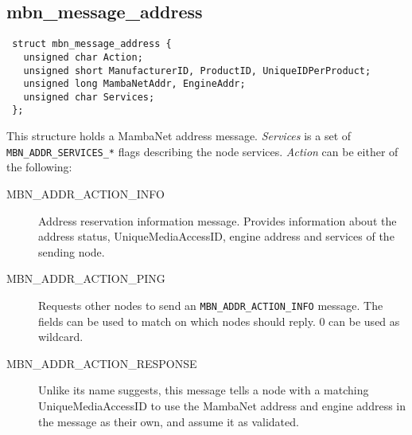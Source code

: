 \subsection{mbn\_message\_address}
\begin{verbatim}
 struct mbn_message_address {
   unsigned char Action;
   unsigned short ManufacturerID, ProductID, UniqueIDPerProduct;
   unsigned long MambaNetAddr, EngineAddr;
   unsigned char Services;
 };
\end{verbatim}
This structure holds a MambaNet address message. \textit{Services} is a set of \verb|MBN_ADDR_SERVICES_*| flags describing the node services. \textit{Action} can be either of the following:
\begin{description}
 \item[MBN\_ADDR\_ACTION\_INFO]
  Address reservation information message. Provides information about the address status, UniqueMediaAccessID, engine address and services of the sending node.
 \item[MBN\_ADDR\_ACTION\_PING]
  Requests other nodes to send an \verb|MBN_ADDR_ACTION_INFO| message. The fields can be used to match on which nodes should reply. 0 can be used as wildcard.
 \item[MBN\_ADDR\_ACTION\_RESPONSE]
  Unlike its name suggests, this message tells a node with a matching UniqueMediaAccessID to use the MambaNet address and engine address in the message as their own, and assume it as validated.
\end{description}


